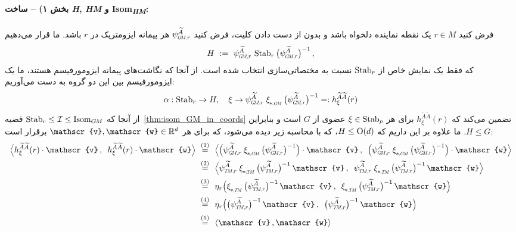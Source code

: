 \paragraph{بخش ۱) -- ساخت \textit{H}, \textit{HM} و Isom\textsubscript{\textit{HM}}:}
فرض کنید $r\in M$ یک نقطه نماینده دلخواه باشد و بدون از دست دادن کلیت، فرض کنید $\psiGMr^{\widetilde{A}}$ هر پیمانه ایزومتریک در $r$ باشد.
ما قرار می‌دهیم
\begin{align}
	H\ :=\ \psiGMr^{\widetilde{A}} \,\Stab{r} \big(\psiGMr^{\widetilde{A}} \big)^{-1} \,,
\end{align}
که فقط یک نمایش خاص از $\operatorname{Stab}_{r}$ نسبت به مختصاتی‌سازی انتخاب شده است.
از آنجا که نگاشت‌های پیمانه ایزومورفیسم هستند، ما یک ایزومورفیسم بین این دو گروه به دست می‌آوریم:
\begin{align}\label{eq:stabr_H_iso}
	\alpha: \Stab{r} \to H,\ \ \ \xi \to \psiGMr^{\widetilde{A}} \;\dxiGM\, \big(\psiGMr^{\widetilde{A}} \big)^{-1} =: h_\xi^{\widetilde{A}\widetilde{A}}(r)
\end{align}
از آنجا که $\operatorname{Stab}_{r} \leq \mathcal{I} \leq \operatorname{Isom}_{G\mkern-1.4muM}$ قضیه~\ref{thm:isom_GM_in_coords} تضمین می‌کند که $h_\xi^{\widetilde{A}\widetilde{A}}(r)$ برای هر $\xi \in \operatorname{Stab}_{p}$ عضوی از $G$ است و بنابراین $H \leq G$.
ما علاوه بر این داریم که $H\leq\operatorname{O}(d)$، که با محاسبه زیر دیده می‌شود، که برای هر $\mathscr{v},\mathscr{w} \in \R^d$ برقرار است:
\begin{align}
	\pig\langle h_\xi^{\widetilde{A}\widetilde{A}}(r) \cdot\mathscr{v} \,,\,\ h_\xi^{\widetilde{A}\widetilde{A}}(r) \cdot\mathscr{w} \pig\rangle
	\ \overset{(1)}{=}&\ \ \pig\langle \pig( \psiGMr^{\widetilde{A}} \;\dxiGM\, \big(\psiGMr^{\widetilde{A}} \big)^{-1} \pig) \cdot \mathscr{v} \,,\,\ \pig( \psiGMr^{\widetilde{A}} \;\dxiGM\, \big(\psiGMr^{\widetilde{A}} \big)^{-1} \pig) \cdot \mathscr{w} \pig\rangle \notag \\
	\ \overset{(2)}{=}&\ \ \pig\langle \psiTMr^{\widetilde{A}} \;\dxiTM\, \big(\psiTMr^{\widetilde{A}} \big)^{-1} \,\mathscr{v} \,,\,\ \psiTMr^{\widetilde{A}} \;\dxiTM\, \big(\psiTMr^{\widetilde{A}} \big)^{-1} \,\mathscr{w} \pig\rangle \notag \\
	\ \overset{(3)}{=}&\ \ \eta_r\pig( \dxiTM\, \big(\psiTMr^{\widetilde{A}} \big)^{-1} \,\mathscr{v} \,,\,\ \dxiTM\, \big(\psiTMr^{\widetilde{A}} \big)^{-1} \,\mathscr{w} \pig) \notag \\
	\ \overset{(4)}{=}&\ \ \eta_r\pig( \big(\psiTMr^{\widetilde{A}} \big)^{-1} \,\mathscr{v} \,,\,\ \big(\psiTMr^{\widetilde{A}} \big)^{-1} \,\mathscr{w} \pig) \notag \\
	\ \overset{(5)}{=}&\ \ \langle \mathscr{v} \,, \mathscr{w} \rangle
\end{align}
